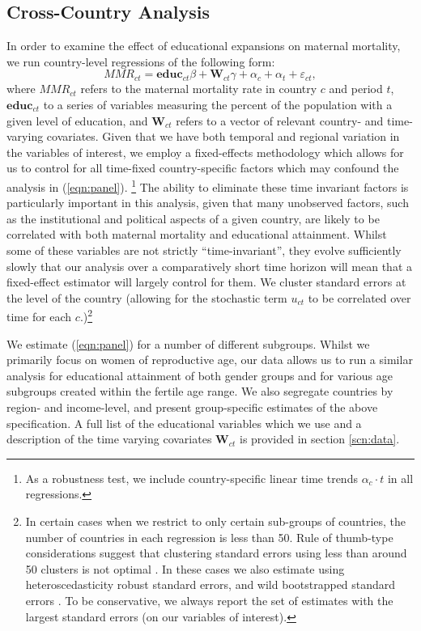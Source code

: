 \documentclass{article}[12pt,subeqn]
\begin{document}
\begin{spacing}{1.4}
\subsection{Cross-Country Analysis}
In order to examine the effect of educational expansions on maternal mortality, 
we run country-level regressions of the following form:
\begin{equation}
\label{eqn:panel}
   MMR_{ct}=\mathbf{educ}_{ct}\beta + \mathbf{W}_{ct}\gamma+\alpha_c+\alpha_t+
   \varepsilon_{ct},
\end{equation}
where $MMR_{ct}$ refers to the maternal mortality rate in country $c$ and period 
$t$, $\mathbf{educ}_{ct}$ to a series of variables measuring the percent of the 
population with a given level of education, and $\mathbf{W}_{ct}$ refers to a 
vector of relevant country- and time-varying covariates.  Given that we have both 
temporal and regional variation in the variables of interest, we employ a 
fixed-effects methodology which allows for us to control for all time-fixed 
country-specific factors which may confound the analysis in (\ref{eqn:panel}).%
\footnote{As a robustness test, we include country-specific linear time trends
$\alpha_c\cdot t$ in all regressions.}
The ability to eliminate these time invariant factors is particularly important 
in this analysis, given that many unobserved factors, such as the institutional 
and political aspects of a given country, are likely to be correlated with both 
maternal mortality and educational attainment. Whilst some of these variables are 
not strictly ``time-invariant'', they evolve sufficiently slowly that our analysis 
over a comparatively short time horizon will mean that a fixed-effect estimator 
will largely control for them. We cluster standard errors at the level of the 
country (allowing for the stochastic term $u_{ct}$ to be correlated over time for 
each $c$.)\footnote{In certain cases when we restrict to only certain sub-groups
of countries, the number of countries in each regression is less than 50.  Rule
of thumb-type considerations suggest that clustering standard errors using less
than around 50 clusters is not optimal \citep{AngristPischke2009,NicholsSchaffer2007}.  
In these cases we also estimate using heteroscedasticity robust standard errors, 
and wild bootstrapped standard errors \citep{MackinnonWebb2014,CameronMiller2015}. 
To be conservative, we always report the set of estimates with the largest 
standard errors (on our variables of interest).}

We estimate (\ref{eqn:panel}) for a number of different subgroups. Whilst we
primarily focus on women of reproductive age, our data allows us to run a similar
analysis for educational attainment of both gender groups and for various age
subgroups created within the fertile age range. We also segregate countries by
region- and income-level, and present group-specific estimates of the above
specification. A full list of the educational variables which we use and a 
description of the time varying covariates $\textbf{W}_{ct}$ is provided in
section \ref{scn:data}. 


\end{spacing}
\end{document}
